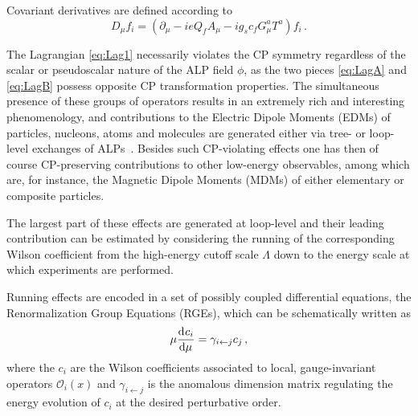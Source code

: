 Covariant derivatives are defined according to 
%
\begin{equation}
\label{eq:CovDev}
D_\mu f_i  = \left( \partial_\mu - i e Q_f A_\mu - i g_s c_f  G_\mu^a  T^a \right) f_i\,.
\end{equation}
%

The Lagrangian \eqref{eq:Lag1} necessarily violates the CP symmetry regardless of the scalar or pseudoscalar nature of the ALP field $\phi$, as the two pieces \eqref{eq:LagA} and \eqref{eq:LagB} possess opposite CP transformation properties.
%
The simultaneous presence of these groups of operators results in an extremely rich and interesting phenomenology, and contributions to the Electric Dipole Moments (EDMs) of particles, nucleons, atoms and molecules are generated either via tree- or loop-level exchanges of ALPs~\cite{Marciano:2016yhf,DiLuzio:2020oah}.
Besides such CP-violating effects one has then of course CP-preserving contributions to other low-energy observables, among which are, for instance, the Magnetic Dipole Moments (MDMs) of either elementary or composite particles.

The largest part of these effects are generated at loop-level and their leading contribution can be estimated by considering the running of the corresponding Wilson coefficient from the high-energy cutoff scale $\Lambda$ down to the energy scale at which experiments are performed. 

Running effects are encoded in a set of possibly coupled differential equations, the Renormalization Group Equations (RGEs), which can be schematically written as 
%
\begin{equation}
\label{eq:AnomalousDimension}
    \mu  \dv[]{c_i}{\mu} = \gamma_{i \leftarrow j} c_{j}\,,
\end{equation}
%
where the $c_i$ are the Wilson coefficients associated to local, 
gauge-invariant operators $\mathcal{O}_i(x)$ and $\gamma_{i \leftarrow j}$ is the anomalous dimension matrix regulating the energy evolution 
of $c_i$ at the desired perturbative order. 
%


